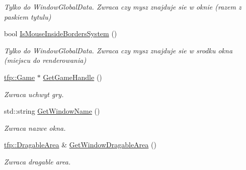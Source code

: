 \begin{DoxyCompactItemize}
\begin{DoxyCompactList}\small\item\em Tylko do Window\+Global\+Data. Zwraca czy mysz znajduje sie w oknie (razem z paskiem tytulu) \end{DoxyCompactList}\item 
\mbox{\label{classtfp_1_1_window_a26ac294480036e53100dfea1f95a5877}} 
bool \mbox{\hyperlink{classtfp_1_1_window_a26ac294480036e53100dfea1f95a5877}{Is\+Mouse\+Inside\+Borders\+System}} ()
\begin{DoxyCompactList}\small\item\em Tylko do Window\+Global\+Data. Zwraca czy mysz znajduje sie w srodku okna (miejscu do renderowania) \end{DoxyCompactList}\item 
\mbox{\label{classtfp_1_1_window_abbcb9b4d65d8c2d37cfd208906421692}} 
\mbox{\hyperlink{classtfp_1_1_game}{tfp\+::\+Game}} $\ast$ \mbox{\hyperlink{classtfp_1_1_window_abbcb9b4d65d8c2d37cfd208906421692}{Get\+Game\+Handle}} ()
\begin{DoxyCompactList}\small\item\em Zwraca uchwyt gry. \end{DoxyCompactList}\item 
\mbox{\label{classtfp_1_1_window_a25340712f1e1b9f03416ef01fb9093ba}} 
std\+::string \mbox{\hyperlink{classtfp_1_1_window_a25340712f1e1b9f03416ef01fb9093ba}{Get\+Window\+Name}} ()
\begin{DoxyCompactList}\small\item\em Zwraca nazwe okna. \end{DoxyCompactList}\item 
\mbox{\label{classtfp_1_1_window_a88aae0b26ba1569fbaa69829c0cb53c2}} 
\mbox{\hyperlink{classtfp_1_1_dragable_area}{tfp\+::\+Dragable\+Area}} \& \mbox{\hyperlink{classtfp_1_1_window_a88aae0b26ba1569fbaa69829c0cb53c2}{Get\+Window\+Dragable\+Area}} ()
\begin{DoxyCompactList}\small\item\em Zwraca dragable area. \end{DoxyCompactList}\item 
\mbox{\label{classtfp_1_1_window_a4504bd36c4813013e6b6a3fa3905f057}} 

\end{DoxyCompactItemize}
